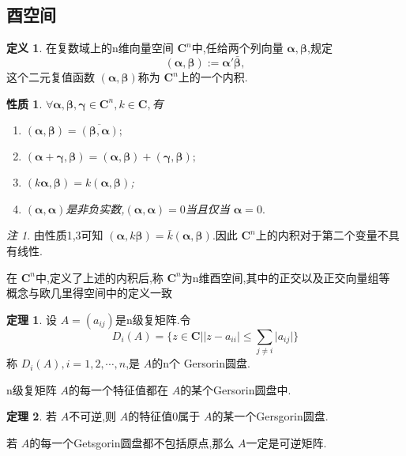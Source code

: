 \documentclass[a4paper,11pt]{article}%
\theoremstyle{remark}
\newtheorem*{remark}{注}
\theoremstyle{definition}
\newtheorem{theorem}{定理}[section]
\theoremstyle{definition}
\newtheorem*{definition}{定义}
\theoremstyle{plain}
\newtheorem*{property}{性质}
\newcommand*{\abs}[1]{\lvert #1 \rvert}
\begin{document}
\subsection{酉空间}
\begin{definition}
    在复数域上的n维向量空间 $\mathbf{C}^n$中,任给两个列向量 $\bm{\alpha},\bm{\beta}$,规定
    \[(\bm{\alpha},\bm{\beta}):=\bm{\alpha}'\bar{\bm{\beta}},\]
    这个二元复值函数 $(\bm{\alpha},\bm{\beta})$称为 $\mathbf{C}^n$上的一个内积.
\end{definition}
\begin{property}
    $\forall \bm{\alpha},\bm{\beta},\bm{\gamma}\in\mathbf{C}^n,k\in \mathbf{C},$有
    \begin{enumerate}
        \item $(\bm{\alpha},\bm{\beta})=\overline{(\bm{\beta},\bm{\alpha})} ;$
        \item $(\bm{\alpha}+\bm{\gamma},\bm{\beta})=(\bm{\alpha},\bm{\beta})+(\bm{\gamma},\bm{\beta});$
        \item $(k \bm{\alpha},\bm{\beta})=k(\bm{\alpha},\bm{\beta})$;
        \item $(\bm{\alpha},\bm{\alpha})$是非负实数,$(\bm{\alpha},\bm{\alpha})=0$当且仅当 $\bm{\alpha}=0.$ 
    \end{enumerate}
\end{property}
\begin{remark}
由性质1,3可知 $(\bm{\alpha},k \bm{\beta})=\bar{k}(\bm{\alpha},\bm{\beta}).$因此 $\mathbf{C}^n$上的内积对于第二个变量不具有线性.
\end{remark}
在 $\mathbf{C}^n$中,定义了上述的内积后,称 $\mathbf{C}^n$为n维酉空间,其中的正交以及正交向量组等
概念与欧几里得空间中的定义一致
\begin{theorem}
    设 $A=(a _{ij})$是n级复矩阵.令
    \[D_i(A)=\{z\in\mathbf{C}\vert \abs{z-a _{ii}}\leq\sum_{j\neq i}{\abs{a _{ij}}}\}\]
    称 $D_i(A),i=1,2,\cdots,n$,是 $A$的n个 Gersorin圆盘.
    
    n级复矩阵 $A$的每一个特征值都在 $A$的某个Gersorin圆盘中.
\end{theorem}
\begin{theorem}
    若 $A$不可逆,则 $A$的特征值0属于 $A$的某一个Gersgorin圆盘.

    若 $A$的每一个Getsgorin圆盘都不包括原点,那么 $A$一定是可逆矩阵.
\end{theorem}
\end{document}
